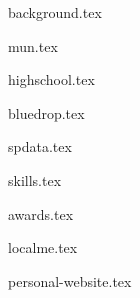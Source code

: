 \documentclass[11pt]{article}
\begin{document}
{background.tex}


{mun.tex}

{highschool.tex}


{bluedrop.tex}

{spdata.tex}


{skills.tex}


{awards.tex}


{localme.tex}

{personal-website.tex}
\end{document}
